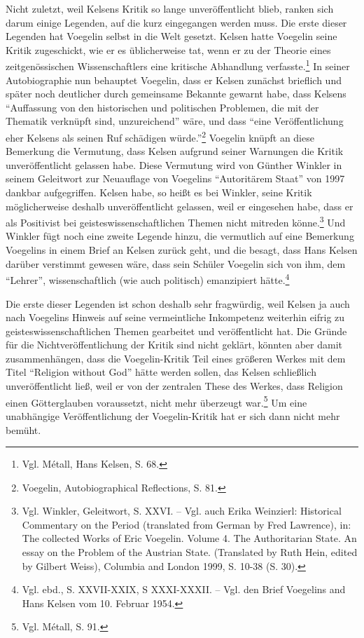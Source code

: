 \documentclass[12pt,a4paper,ngerman]{article}
\begin{document}
Nicht zuletzt, weil Kelsens Kritik so lange unveröffentlicht blieb, ranken
sich darum einige Legenden, auf die kurz eingegangen werden muss. Die erste
dieser Legenden hat Voegelin selbst in die Welt gesetzt. Kelsen hatte Voegelin
seine Kritik zugeschickt, wie er es üblicherweise tat, wenn er zu der Theorie
eines zeitgenössischen Wissenschaftlers eine kritische Abhandlung
verfasste.\footnote{Vgl.  Métall, Hans Kelsen, S. 68.} In seiner
Autobiographie nun behauptet Voegelin, dass er Kelsen zunächst brieflich und
später noch deutlicher durch gemeinsame Bekannte gewarnt habe, dass Kelsens
"`Auffassung von den historischen und politischen Problemen, die mit der
Thematik verknüpft sind, unzureichend"' wäre, und dass "`eine Veröffentlichung
eher Kelsens als seinen Ruf schädigen würde."'\footnote{Voegelin,
  Autobiographical Reflections, S. 81.}  Voegelin knüpft an diese Bemerkung
die Vermutung, dass Kelsen aufgrund seiner Warnungen die Kritik
unveröffentlicht gelassen habe.  Diese Vermutung wird von Günther Winkler in
seinem Geleitwort zur Neuauflage von Voegelins "`Autoritärem Staat"' von 1997
dankbar aufgegriffen.  Kelsen habe, so heißt es bei Winkler, seine Kritik
möglicherweise deshalb unveröffentlicht gelassen, weil er eingesehen habe,
dass er als Positivist bei geisteswissenschaftlichen Themen nicht mitreden
könne.\footnote{Vgl. Winkler, Geleitwort, S. XXVI. -- Vgl. auch Erika
  Weinzierl: Historical Commentary on the Period (translated from German by
  Fred Lawrence), in: The collected Works of Eric Voegelin.  Volume 4. The
  Authoritarian State. An essay on the Problem of the Austrian State.
  (Translated by Ruth Hein, edited by Gilbert Weiss), Columbia and London
  1999, S. 10-38 (S. 30).} Und Winkler fügt noch eine zweite Legende hinzu,
die vermutlich auf eine Bemerkung Voegelins in einem Brief an Kelsen zurück
geht, und die besagt, dass Hans Kelsen darüber verstimmt gewesen wäre, dass
sein Schüler Voegelin sich von ihm, dem "`Lehrer"', wissenschaftlich (wie auch
politisch) emanzipiert hätte.\footnote{Vgl.  ebd., S.  XXVII-XXIX, S
  XXXI-XXXII.  -- Vgl. den Brief Voegelins and Hans Kelsen vom 10. Februar
  1954.}

Die erste dieser Legenden ist schon deshalb sehr fragwürdig, weil Kelsen ja
auch nach Voegelins Hinweis auf seine vermeintliche Inkompetenz weiterhin
eifrig zu geisteswissenschaftlichen Themen gearbeitet und veröffentlicht hat.
Die Gründe für die Nichtveröffentlichung der Kritik sind nicht geklärt,
könnten aber damit zusammenhängen, dass die Voegelin-Kritik Teil eines
größeren Werkes mit dem Titel "`Religion without God"' hätte werden sollen,
das Kelsen schließlich unveröffentlicht ließ, weil er von der zentralen These
des Werkes, dass Religion einen Götterglauben voraussetzt, nicht mehr
überzeugt war.\footnote{Vgl.  Métall, S. 91.}  Um eine unabhängige
Veröffentlichung der Voegelin-Kritik hat er sich dann nicht mehr bemüht.
\end{document}
